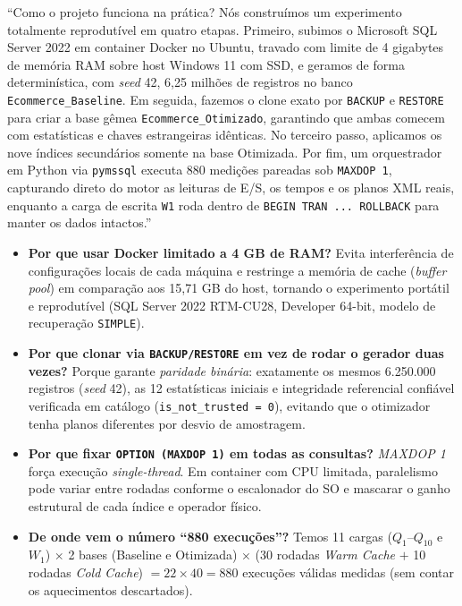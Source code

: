 \documentclass[10pt,a4paper]{article}
\begin{document}
\begin{falaBox}
``Como o projeto funciona na prática? Nós construímos um experimento totalmente reprodutível em quatro etapas. Primeiro, subimos o Microsoft SQL Server 2022 em container Docker no Ubuntu, travado com limite de 4 gigabytes de memória RAM sobre host Windows 11 com SSD, e geramos de forma determinística, com \emph{seed} 42, 6,25 milhões de registros no banco \texttt{Ecommerce\_Baseline}. Em seguida, fazemos o clone exato por \texttt{BACKUP} e \texttt{RESTORE} para criar a base gêmea \texttt{Ecommerce\_Otimizado}, garantindo que ambas comecem com estatísticas e chaves estrangeiras idênticas. No terceiro passo, aplicamos os nove índices secundários somente na base Otimizada. Por fim, um orquestrador em Python via \texttt{pymssql} executa 880 medições pareadas sob \texttt{MAXDOP 1}, capturando direto do motor as leituras de E/S, os tempos e os planos XML reais, enquanto a carga de escrita \texttt{W1} roda dentro de \texttt{BEGIN TRAN ... ROLLBACK} para manter os dados intactos.''
\end{falaBox}

\begin{expBox}
  \begin{itemize}[leftmargin=14pt,itemsep=2pt,topsep=1pt]
    \item \textbf{Por que usar Docker limitado a 4 GB de RAM?} Evita interferência de configurações locais de cada máquina e restringe a memória de cache (\emph{buffer pool}) em comparação aos 15,71 GB do host, tornando o experimento portátil e reprodutível (SQL Server 2022 RTM-CU28, Developer 64-bit, modelo de recuperação \texttt{SIMPLE}).
    \item \textbf{Por que clonar via \texttt{BACKUP/RESTORE} em vez de rodar o gerador duas vezes?} Porque garante \emph{paridade binária}: exatamente os mesmos 6.250.000 registros (\emph{seed} 42), as 12 estatísticas iniciais e integridade referencial confiável verificada em catálogo (\texttt{is\_not\_trusted = 0}), evitando que o otimizador tenha planos diferentes por desvio de amostragem.
    \item \textbf{Por que fixar \texttt{OPTION (MAXDOP 1)} em todas as consultas?} \emph{MAXDOP 1} força execução \emph{single-thread}. Em container com CPU limitada, paralelismo pode variar entre rodadas conforme o escalonador do SO e mascarar o ganho estrutural de cada índice e operador físico.
    \item \textbf{De onde vem o número ``880 execuções''?} Temos 11 cargas ($Q_1$--$Q_{10}$ e $W_1$) $\times$ 2 bases (Baseline e Otimizada) $\times$ (30 rodadas \emph{Warm Cache} $+$ 10 rodadas \emph{Cold Cache}) $= 22 \times 40 = 880$ execuções válidas medidas (sem contar os aquecimentos descartados).
  \end{itemize}
\end{expBox}
\end{document}
